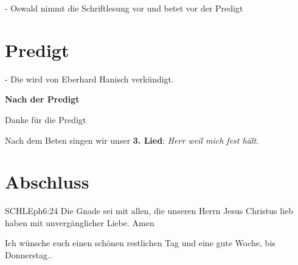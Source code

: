 \documentclass{../inc/mybib}
\begin{document}
- Oswald nimmt die Schriftlesung vor und betet vor der Predigt

\section{Predigt}
- Die wird von Eberhard Hanisch verkündigt.

\textbf{Nach der Predigt}

Danke für die Predigt

Nach dem Beten singen wir unser \textbf{3. Lied}: \textit{Herr weil mich fest hält.}\\

\section{Abschluss}

\begin{bibelbox}{SCHL}{Eph}{6:24}
Die Gnade sei mit allen, die unseren Herrn Jesus Christus lieb haben mit unvergänglicher Liebe. Amen
\end{bibelbox}

Ich wünsche euch einen schönen restlichen Tag und eine gute Woche, bis Donnerstag..
\end{document}

